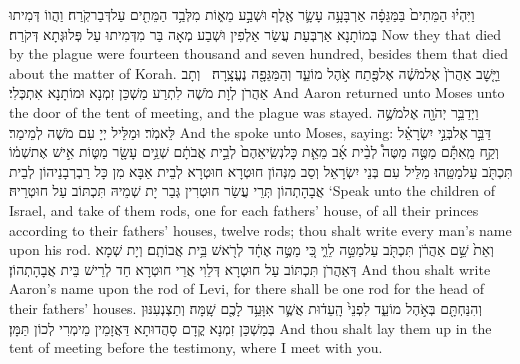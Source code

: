 {וַיִּהְי֗וּ הַמֵּתִים֙ בַּמַּגֵּפָ֔ה אַרְבָּעָ֥ה עָשָׂ֛ר אֶ֖לֶף וּשְׁבַ֣ע מֵא֑וֹת מִלְּבַ֥ד הַמֵּתִ֖ים עַל\maqqaf דְּבַר\maqqaf קֹֽרַח׃}
{וַהֲווֹ דְּמִיתוּ בְּמוֹתָנָא אַרְבְּעַת עֲשַׂר אַלְפִין וּשְׁבַע מְאָה בַּר מִדְּמִיתוּ עַל פְּלוּגְּתָא דְּקֹרַח׃}
{Now they that died by the plague were fourteen thousand and seven hundred, besides them that died about the matter of Korah.}{}
{וַיָּ֤שׇׁב אַהֲרֹן֙ אֶל\maqqaf מֹשֶׁ֔ה אֶל\maqqaf פֶּ֖תַח אֹ֣הֶל מוֹעֵ֑ד וְהַמַּגֵּפָ֖ה נֶעֱצָֽרָה׃ \petucha }
{וְתָב אַהֲרֹן לְוָת מֹשֶׁה לִתְרַע מַשְׁכַּן זִמְנָא וּמוֹתָנָא אִתְכְּלִי׃}
{And Aaron returned unto Moses unto the door of the tent of meeting, and the plague was stayed.}{}
{וַיְדַבֵּ֥ר יְהֹוָ֖ה אֶל\maqqaf מֹשֶׁ֥ה לֵּאמֹֽר׃}
{וּמַלֵּיל יְיָ עִם מֹשֶׁה לְמֵימַר׃}
{And the \lord\space spoke unto Moses, saying:}{}
{דַּבֵּ֣ר \legarmeh  אֶל\maqqaf בְּנֵ֣י יִשְׂרָאֵ֗ל וְקַ֣ח מֵֽאִתָּ֡ם מַטֶּ֣ה מַטֶּה֩ לְבֵ֨ית אָ֜ב מֵאֵ֤ת כׇּל\maqqaf נְשִֽׂיאֵהֶם֙ לְבֵ֣ית אֲבֹתָ֔ם שְׁנֵ֥ים עָשָׂ֖ר מַטּ֑וֹת אִ֣ישׁ אֶת\maqqaf שְׁמ֔וֹ תִּכְתֹּ֖ב עַל\maqqaf מַטֵּֽהוּ׃}
{מַלֵּיל עִם בְּנֵי יִשְׂרָאֵל וְסַב מִנְּהוֹן חוּטְרָא חוּטְרָא לְבֵית אַבָּא מִן כָּל רַבְרְבָנֵיהוֹן לְבֵית אֲבָהָתְהוֹן תְּרֵי עֲשַׂר חוּטְרִין גְּבַר יָת שְׁמֵיהּ תִּכְתּוֹב עַל חוּטְרֵיהּ׃}
{‘Speak unto the children of Israel, and take of them rods, one for each fathers’ house, of all their princes according to their fathers’ houses, twelve rods; thou shalt write every man’s name upon his rod.}{}
{וְאֵת֙ שֵׁ֣ם אַהֲרֹ֔ן תִּכְתֹּ֖ב עַל\maqqaf מַטֵּ֣ה לֵוִ֑י כִּ֚י מַטֶּ֣ה אֶחָ֔ד לְרֹ֖אשׁ בֵּ֥ית אֲבוֹתָֽם׃}
{וְיָת שְׁמָא דְּאַהֲרֹן תִּכְתּוֹב עַל חוּטְרָא דְּלֵוִי אֲרֵי חוּטְרָא חַד לְרֵישׁ בֵּית אֲבָהָתְהוֹן׃}
{And thou shalt write Aaron’s name upon the rod of Levi, for there shall be one rod for the head of their fathers’ houses.}{}
{וְהִנַּחְתָּ֖ם בְּאֹ֣הֶל מוֹעֵ֑ד לִפְנֵי֙ הָֽעֵד֔וּת אֲשֶׁ֛ר אִוָּעֵ֥ד לָכֶ֖ם שָֽׁמָּה׃}
{וְתַצְנְעִנּוּן בְּמַשְׁכַּן זִמְנָא קֳדָם סָהֲדוּתָא דַּאֲזָמֵין מֵימְרִי לְכוֹן תַּמָּן׃}
{And thou shalt lay them up in the tent of meeting before the testimony, where I meet with you.}{}
